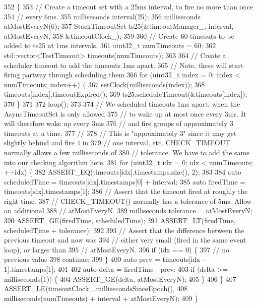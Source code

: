 \begin{DoxyCode}
352                                   \{
353   \textcolor{comment}{// Create a timeout set with a 25ms interval, to fire no more than once}
354   \textcolor{comment}{// every 6ms.}
355   milliseconds interval(25);
356   milliseconds atMostEveryN(6);
357   StackTimeoutSet ts25(&timeoutManager\_, interval, atMostEveryN,
358                        &timeoutClock\_);
359 
360   \textcolor{comment}{// Create 60 timeouts to be added to ts25 at 1ms intervals.}
361   uint32\_t numTimeouts = 60;
362   std::vector<TestTimeout> timeouts(numTimeouts);
363 
364   \textcolor{comment}{// Create a scheduler timeout to add the timeouts 1ms apart.}
365   \textcolor{comment}{// Note, these will start firing partway through scheduling them}
366   \textcolor{keywordflow}{for} (uint32\_t index = 0; index < numTimeouts; index++) \{
367     setClock(milliseconds(index));
368     timeouts[index].timeoutExpired();
369     ts25.scheduleTimeout(&timeouts[index]);
370   \}
371 
372   loop();
373 
374   \textcolor{comment}{// We scheduled timeouts 1ms apart, when the AsyncTimeoutSet is only allowed}
375   \textcolor{comment}{// to wake up at most once every 3ms.  It will therefore wake up every 3ms}
376   \textcolor{comment}{// and fire groups of approximately 3 timeouts at a time.}
377   \textcolor{comment}{//}
378   \textcolor{comment}{// This is "approximately 3" since it may get slightly behind and fire 4 in}
379   \textcolor{comment}{// one interval, etc.  CHECK\_TIMEOUT normally allows a few milliseconds of}
380   \textcolor{comment}{// tolerance.  We have to add the same into our checking algorithm here.}
381   \textcolor{keywordflow}{for} (uint32\_t idx = 0; idx < numTimeouts; ++idx) \{
382     ASSERT\_EQ(timeouts[idx].timestamps.size(), 2);
383 
384     \textcolor{keyword}{auto} scheduledTime = timeouts[idx].timestamps[0] + interval;
385     \textcolor{keyword}{auto} firedTime = timeouts[idx].timestamps[1];
386     \textcolor{comment}{// Assert that the timeout fired at roughly the right time.}
387     \textcolor{comment}{// CHECK\_TIMEOUT() normally has a tolerance of 5ms.  Allow an additional}
388     \textcolor{comment}{// atMostEveryN.}
389     milliseconds tolerance = atMostEveryN;
390     ASSERT\_GE(firedTime, scheduledTime);
391     ASSERT\_LT(firedTime, scheduledTime + tolerance);
392 
393     \textcolor{comment}{// Assert that the difference between the previous timeout and now was}
394     \textcolor{comment}{// either very small (fired in the same event loop), or larger than}
395     \textcolor{comment}{// atMostEveryN.}
396     \textcolor{keywordflow}{if} (idx == 0) \{
397       \textcolor{comment}{// no previous value}
398       \textcolor{keywordflow}{continue};
399     \}
400     \textcolor{keyword}{auto} prev = timeouts[idx - 1].timestamps[1];
401 
402     \textcolor{keyword}{auto} delta = firedTime - prev;
403     \textcolor{keywordflow}{if} (delta >= milliseconds(1)) \{
404       ASSERT\_GE(delta, atMostEveryN);
405     \}
406   \}
407   ASSERT\_LE(timeoutClock\_.millisecondsSinceEpoch(),
408             milliseconds(numTimeouts) + interval + atMostEveryN);
409 \}
\end{DoxyCode}
